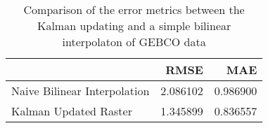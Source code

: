\begin{table}[h!]
\caption{Comparison of the error metrics between the Kalman updating and a simple bilinear interpolaton of GEBCO data}
\label{raster_rmse_comparison}
\begin{tabular}{lrr}
\toprule
 & RMSE & MAE \\
\midrule
Naive Bilinear Interpolation & 2.086102 & 0.986900 \\
Kalman Updated Raster & 1.345899 & 0.836557 \\
\bottomrule
\end{tabular}
\end{table}
